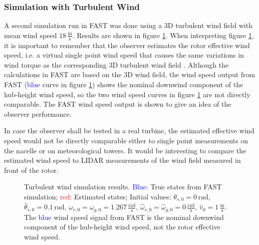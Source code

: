 \documentclass[a4paper]{article}
\begin{document}
\subsubsection{Simulation with Turbulent Wind}

A second simulation run in FAST was done using a 3D turbulent wind field with mean wind speed $18\,\frac{\text{m}}{\text{s}}$. Results are shown in figure
\ref{Figs_obs_FAST_turb}. When interpreting figure \ref{Figs_obs_FAST_turb}, it is important to remember that the observer estimates the rotor effective wind speed, i.e. a virtual single point wind speed that causes the same variations in wind torque as the corresponding 3D turbulent wind field \cite{DOWECreport}. Although the calculations in FAST are based on the 3D wind field, the wind speed output from FAST (\textcolor{blue}{blue} curve in figure \ref{Figs_obs_FAST_turb}) shows the nominal downwind component of the hub-height wind speed, so the two wind speed curves in figure \ref{Figs_obs_FAST_turb} are not directly comparable. The FAST wind speed output is shown to give an idea of the observer performance.

In case the observer shall be tested in a real turbine, the estimated effective wind speed would not be directly comparable either to single point measurements on the nacelle or on meteorological towers. It would be interesting to compare the estimated wind speed to LIDAR measurements of the wind field measured in front of the rotor.


\begin{figure}[htbp!]
\centerline{}
\vfil
{}
\hfil
{}
\hfil
{}
\caption{Turbulent wind simulation results. \textcolor{blue}{Blue}: True states from FAST simulation; \textcolor{red}{red}: Estimated states; Initial values:
			$\theta_{s,0} = 0\,\text{rad}$, $\hat{\theta}_{s,0} = 0.1\,\text{rad}$, $\omega_{r,0} = \omega_{g,0} = 1.267 \,\frac{\text{rad}}{\text{s}}$,
			$\hat{\omega}_{r,0} = \hat{\omega}_{g,0} = 0 \,\frac{\text{rad}}{\text{s}}$,
			$\hat{v}_0 = 1 \,\frac{\text{m}}{\text{s}}$. The \textcolor{blue}{blue} wind speed signal from FAST is the nominal downwind component of the hub-height wind speed, not the rotor effective wind speed.}
\label{Figs_obs_FAST_turb}
\end{figure}
\end{document}

